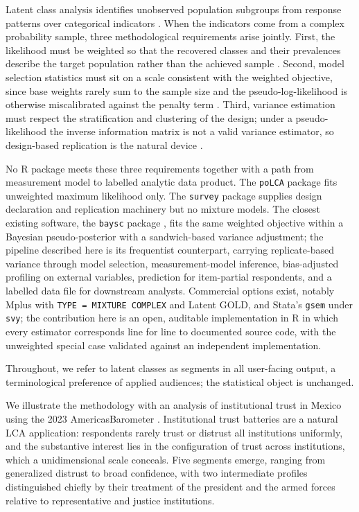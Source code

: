 \documentclass[
  12pt]{article}
\begin{document}
Latent class analysis identifies unobserved population subgroups from
response patterns over categorical indicators
\citep{lazarsfeld1968, goodman1974}. When the indicators come from a
complex probability sample, three methodological requirements arise
jointly. First, the likelihood must be weighted so that the recovered
classes and their prevalences describe the target population rather than
the achieved sample \citep{patterson2002, asparouhov2005}. Second, model
selection statistics must sit on a scale consistent with the weighted
objective, since base weights rarely sum to the sample size and the
pseudo-log-likelihood is otherwise miscalibrated against the penalty
term \citep{lumley2015}. Third, variance estimation must respect the
stratification and clustering of the design; under a pseudo-likelihood
the inverse information matrix is not a valid variance estimator, so
design-based replication is the natural device
\citep{wolter2007, rust1996}.

No R package meets these three requirements together with a path from
measurement model to labelled analytic data product. The \texttt{poLCA}
package \citep{linzer2011} fits unweighted maximum likelihood only. The
\texttt{survey} package \citep{lumley2004} supplies design declaration
and replication machinery but no mixture models. The closest existing
software, the \texttt{baysc} package \citep{wu2024, stephenson2026},
fits the same weighted objective within a Bayesian pseudo-posterior with
a sandwich-based variance adjustment; the pipeline described here is its
frequentist counterpart, carrying replicate-based variance through model
selection, measurement-model inference, bias-adjusted profiling on
external variables, prediction for item-partial respondents, and a
labelled data file for downstream analysts. Commercial options exist,
notably Mplus with \texttt{TYPE\ =\ MIXTURE\ COMPLEX} and Latent GOLD,
and Stata's \texttt{gsem} under \texttt{svy}; the contribution here is
an open, auditable implementation in R in which every estimator
corresponds line for line to documented source code, with the unweighted
special case validated against an independent implementation.

Throughout, we refer to latent classes as segments in all user-facing
output, a terminological preference of applied audiences; the
statistical object is unchanged.

We illustrate the methodology with an analysis of institutional trust in
Mexico using the 2023 AmericasBarometer \citep{lapop2023}. Institutional
trust batteries are a natural LCA application: respondents rarely trust
or distrust all institutions uniformly, and the substantive interest
lies in the configuration of trust across institutions, which a
unidimensional scale conceals. Five segments emerge, ranging from
generalized distrust to broad confidence, with two intermediate profiles
distinguished chiefly by their treatment of the president and the armed
forces relative to representative and justice institutions.
\end{document}

